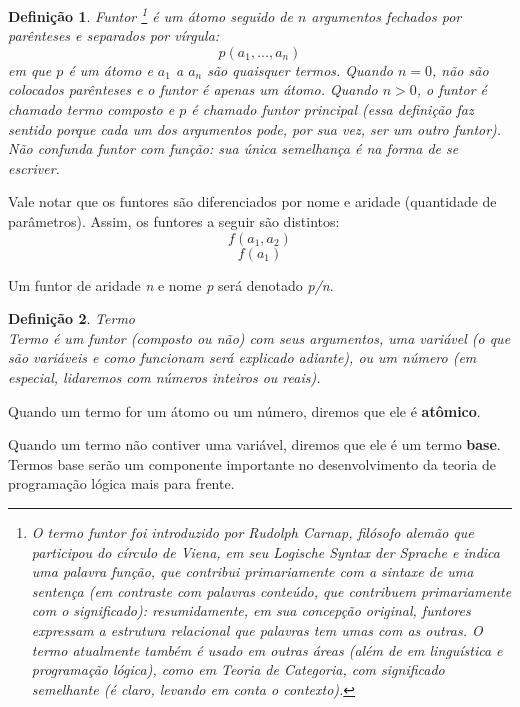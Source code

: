 \documentclass{article}
\newtheorem{definition}{Definição}[section]
\theoremstyle{remark}
\begin{document}
  \theoremstyle{definition}
  \begin{definition}{Funtor}
    \footnote{ O termo \textit{funtor} foi introduzido por Rudolph Carnap, filósofo alemão que participou do círculo de Viena, em seu \textit{Logische Syntax der Sprache} e indica uma \textit{palavra função}, que contribui primariamente com a sintaxe de uma sentença (em contraste com \textit{palavras conteúdo}, que contribuem primariamente com o significado): resumidamente, em sua concepção original, funtores expressam a estrutura relacional que palavras tem umas com as outras. O termo atualmente também é usado em outras áreas (além de em linguística e programação lógica), como em \textit{Teoria de Categoria}, com   significado semelhante (é claro, levando em conta o contexto).  }
    é um átomo seguido de $n$ argumentos fechados por parênteses e separados por vírgula:
    \[
      p(a_1, ..., a_n)
    \]
\noindent em que $p$ é um átomo e $a_1$ a $a_n$ são quaisquer termos. Quando $n = 0$, não são colocados parênteses e o funtor é apenas um átomo. Quando $n > 0$, o funtor é chamado \textit{termo composto} e $p$ é chamado \textit{funtor principal} (essa definição faz sentido porque cada um dos argumentos pode, por sua vez, ser um outro funtor).
  Não confunda funtor com função: sua única semelhança é na forma de se escriver.
  \end{definition}
Vale notar que os funtores são diferenciados por nome e aridade (quantidade de parâmetros). Assim, os funtores a seguir são distintos:
    \[
      f(a_1, a_2)
    \]
    \[
      f(a_1)
    \]

    Um funtor de aridade \textit{n} e nome \textit{p} será denotado \textit{p/n}.



  \theoremstyle{definition}
  \begin{definition}{Termo}
    \\Termo é um funtor (composto ou não) com seus argumentos, uma variável (o que são variáveis e como funcionam será explicado adiante), ou um número (em especial, lidaremos com números inteiros ou reais).
  \end{definition}

  Quando um termo for um átomo ou um número, diremos que ele é \textbf{atômico}.

Quando um termo não contiver uma variável, diremos que ele é um termo \textbf{base}.
Termos base serão um componente importante no desenvolvimento da teoria de programação lógica mais para frente.
\end{document}
